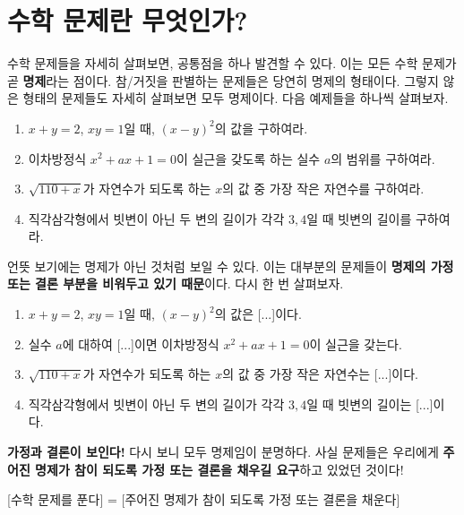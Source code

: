 \chapter{수학 문제란 무엇인가?}

수학 문제들을 자세히 살펴보면, 공통점을 하나 발견할 수 있다. 이는 모든 수학 문제가 곧 \textbf{명제}라는 점이다. 참/거짓을 판별하는 문제들은 당연히 명제의 형태이다. 그렇지 않은 형태의 문제들도 자세히 살펴보면 모두 명제이다. 다음 예제들을 하나씩 살펴보자.

\bigskip

\begin{enumerate}
    \item \(x + y = 2\), \(xy = 1\)일 때, \((x - y)^2\)의 값을 구하여라.
    \item 이차방정식 \(x^2 + ax + 1 = 0\)이 실근을 갖도록 하는 실수 \(a\)의 범위를 구하여라.
    \item \(\sqrt{110+x}\)가 자연수가 되도록 하는 \(x\)의 값 중 가장 작은 자연수를 구하여라.
    \item 직각삼각형에서 빗변이 아닌 두 변의 길이가 각각 \(3, 4\)일 때 빗변의 길이를 구하여라.
\end{enumerate}

\bigskip

언뜻 보기에는 명제가 아닌 것처럼 보일 수 있다. 이는 대부분의 문제들이 \textbf{명제의 가정 또는 결론 부분을 비워두고 있기 때문}이다. 다시 한 번 살펴보자.

\bigskip

\begin{enumerate}
    \item \(x + y = 2\), \(xy = 1\)일 때, \((x - y)^2\)의 값은 [...]이다.
    \item 실수 \(a\)에 대하여 [...]이면 이차방정식 \(x^2 + ax + 1 = 0\)이 실근을 갖는다.
    \item \(\sqrt{110+x}\)가 자연수가 되도록 하는 \(x\)의 값 중 가장 작은 자연수는 [...]이다.
    \item 직각삼각형에서 빗변이 아닌 두 변의 길이가 각각 \(3, 4\)일 때 빗변의 길이는 [...]이다.
\end{enumerate}

\bigskip

\textbf{가정과 결론이 보인다!} 다시 보니 모두 명제임이 분명하다. 사실 문제들은 우리에게 \textbf{주어진 명제가 참이 되도록 가정 또는 결론을 채우길 요구}하고 있었던 것이다!

\begin{center}
    [수학 문제를 푼다] = [주어진 명제가 참이 되도록 가정 또는 결론을 채운다]
\end{center}

